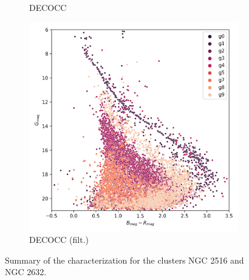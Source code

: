 \documentclass[preprint,12pt,authoryear]{elsarticle}
\begin{document}
\begin{figure}[!hbt]
\begin{subfigure}{0.29\textwidth}
    \caption{DECOCC}
  \end{subfigure}%
  \begin{subfigure}{0.29\textwidth}
    \includegraphics[width=\textwidth]{../figures/ngc_2632/dec_hr_diagram_filtered_ngc_2632.png}
    \caption{DECOCC (filt.)}
  \end{subfigure}
  \caption{Summary of the characterization for the clusters NGC 2516 and NGC 2632.}
  \label{fig:ngc_2516_ngc_2632_characterization_evolution}
\end{figure}
\end{document}
